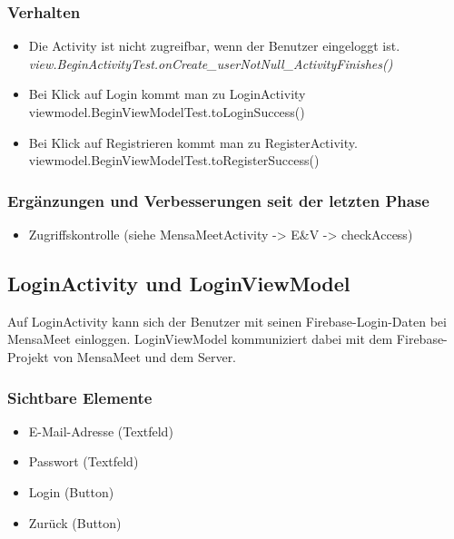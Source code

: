 \documentclass[a4paper]{scrreprt}
\begin{document}
\subsubsection{Verhalten} 
\begin{itemize}
\item Die Activity ist nicht zugreifbar, wenn der Benutzer eingeloggt ist.\\
 \textit{view.BeginActivityTest.onCreate\_userNotNull\_ActivityFinishes()}
\item Bei Klick auf Login kommt man zu LoginActivity \\
viewmodel.BeginViewModelTest.toLoginSuccess()
\item Bei Klick auf Registrieren kommt man zu RegisterActivity. \\
viewmodel.BeginViewModelTest.toRegisterSuccess()
\end{itemize}

\subsubsection{Ergänzungen und Verbesserungen seit der letzten Phase} 
\begin{itemize}
\item Zugriffskontrolle (siehe MensaMeetActivity -> E\&V -> checkAccess)
\end{itemize}

\subsection{LoginActivity und LoginViewModel}

Auf LoginActivity kann sich der Benutzer mit seinen Firebase-Login-Daten bei MensaMeet einloggen. LoginViewModel kommuniziert dabei mit dem Firebase-Projekt von MensaMeet und dem Server.

\subsubsection{Sichtbare Elemente}
\begin{itemize}
\item E-Mail-Adresse (Textfeld)
\item Passwort (Textfeld)
\item Login (Button)
\item Zurück (Button)
\end{itemize}
\end{document}
